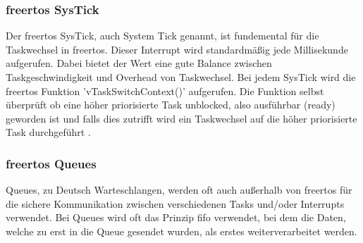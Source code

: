 \documentclass[../EDF Master Thesis.tex]{subfiles}
\begin{document}
\subsubsection{\ac{freertos} SysTick} \label{section:freertos_sys_tick}
Der \ac{freertos} SysTick, auch System Tick genannt, ist fundemental für die Taskwechsel in \ac{freertos}.
Dieser Interrupt wird standardmäßig jede Millisekunde aufgerufen.
Dabei bietet der Wert eine gute Balance zwischen Taskgeschwindigkeit und Overhead von Taskwechsel.
Bei jedem SysTick wird die \ac{freertos} Funktion 'vTaskSwitchContext()' aufgerufen.
Die Funktion selbst überprüft ob eine höher priorisierte Task unblocked, also ausführbar (ready) geworden ist und falls dies zutrifft wird ein Taskwechsel auf die höher priorisierte Task durchgeführt \autocite{freertos_systick}.

\subsubsection{\ac{freertos} Queues} \label{section:queues}
Queues, zu Deutsch Warteschlangen, werden oft auch außerhalb von \ac{freertos} für die sichere Kommunikation zwischen verschiedenen Tasks und/oder Interrupts verwendet.
Bei Queues wird oft das Prinzip \ac{fifo} verwendet, bei dem die Daten, welche zu erst in die Queue gesendet wurden, als erstes weiterverarbeitet werden.
\end{document}
